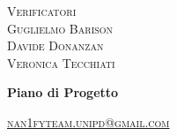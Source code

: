 \documentclass[8pt]{article}
\begin{document}
\begin{titlepage}
\begin{minipage}[t]{0.47\textwidth}
{		}
		\vspace{8mm}
		
		{\large{\textsc{Verificatori}}
			\vspace{3mm}
			{\\\large{\textsc{Guglielmo Barison}\\}}
			{\large{\textsc{Davide Donanzan}\\}}
      {\large{\textsc{Veronica Tecchiati}\\}}
		}
		\vspace{4mm}\vspace{4mm}
	\end{minipage}
	\vspace{4cm}
	\begin{center}
		\begin{flushright}
			{\fontsize{30pt}{52pt}\selectfont \textbf{Piano di Progetto\\}} %
		\end{flushright}
		\vspace{3cm}
	\end{center}
	\vspace{8.5cm}
	{\small \textsc{\href{mailto: nan1fyteam.unipd@gmail.com}{\color{black}nan1fyteam.unipd@gmail.com}}}
\end{titlepage}
\pagestyle{mystyle}
\end{document}
